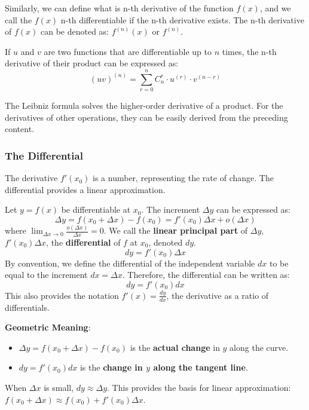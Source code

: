 \documentclass[oneside]{book}
\begin{document}
Similarly, we can define what is n-th derivative of the function $f(x)$, and we call the $f(x)$ n-th differentiable if the n-th derivative exists. The n-th derivative of $f(x)$ can be denoted as: $f^{(n)}(x)$ or $f^{(n)}$.

\newpage

\begin{theorem}
If $u$ and $v$ are two functions that are differentiable up to $n$ times, the n-th derivative of their product can be expressed as:
\[
(uv)^{(n)}=\sum_{r=0}^{n} C_{n}^{r}\cdot u^{(r)}\cdot v^{(n-r)}
\]

\end{theorem}

The Leibniz formula solves the higher-order derivative of a product. For the derivatives of other operations, they can be easily derived from the preceding content.

\subsubsection{The Differential}

The derivative $f'(x_0)$ is a number, representing the rate of change. The differential provides a linear approximation.

\begin{definition}[Differential]
Let $y = f(x)$ be differentiable at $x_0$. The increment $\Delta y$ can be expressed as:
\[
\Delta y = f(x_0 + \Delta x) - f(x_0) = f'(x_0)\Delta x + o(\Delta x)
\]
where $\lim_{\Delta x \to 0} \frac{o(\Delta x)}{\Delta x} = 0$.
We call the \textbf{linear principal part} of $\Delta y$, $f'(x_0)\Delta x$, the \textbf{differential} of $f$ at $x_0$, denoted $dy$.
\[
dy = f'(x_0) \Delta x
\]
By convention, we define the differential of the independent variable $dx$ to be equal to the increment $dx = \Delta x$.
Therefore, the differential can be written as:
\[
dy = f'(x_0) dx
\]
This also provides the notation $f'(x) = \frac{dy}{dx}$, the derivative as a ratio of differentials.
\end{definition}



\textbf{Geometric Meaning}:
\begin{itemize}
    \item $\Delta y = f(x_0 + \Delta x) - f(x_0)$ is the \textbf{actual change} in $y$ along the curve.
    \item $dy = f'(x_0) dx$ is the \textbf{change in $y$ along the tangent line}.
\end{itemize}
When $\Delta x$ is small, $dy \approx \Delta y$. This provides the basis for linear approximation: $f(x_0 + \Delta x) \approx f(x_0) + f'(x_0) \Delta x$.
\end{document}

